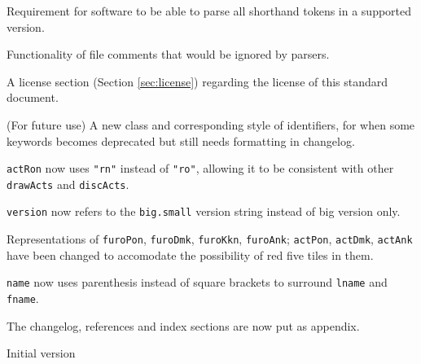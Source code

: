 \documentclass[%
	a4paper%
	,10pt%
	,twoside%
	,notitlepage%
]{article}%
\renewcommand*{\DTMdisplaydate}[4]{%
		\ifnum##4>-1{\DTMenglishshortweekdayname{##4}\space}\fi%
		\DTMtwodigits{##3}\space%
		\DTMenglishshortmonthname{##2}\space%
		##1%
	}%
\newcommand*{\github}[1]{\texorpdfstring{\href{https://github.com/#1}{\texttt{#1}}}{#1}}%
\begin{document}
\begin{changelog}[%
	section=true%
	,sectioncmd={\section}%
	,title={Changelog}%
	,label={sec:changelog}%
]
\begin{version}[%
		version=1.0.0-β%
		,author={\github{ChemistMikeLam}}%
		,date=Unreleased%
	]
			\item{}Requirement for software to be able to parse all shorthand tokens in a supported version. %
			\item{}Functionality of file comments that would be ignored by parsers. %
			\item{}A license section (Section \ref{sec:license}) regarding the license of this standard document. %
			\item{}(For future use) A new class and corresponding style of identifiers, for when some keywords becomes deprecated but still needs formatting in changelog. %
		\changed{}%
			\item{}\lstinline/actRon/ now uses \lstinline/"rn"/ instead of \lstinline/"ro"/, allowing it to be consistent with other \lstinline/drawActs/ and \lstinline/discActs/. %
			\item{}\lstinline/version/ now refers to the \texttt{big.small} version string instead of big version only. %
			\item{}Representations of \lstinline/furoPon/, \lstinline/furoDmk/, \lstinline/furoKkn/, \lstinline/furoAnk/; \lstinline/actPon/, \lstinline/actDmk/, \lstinline/actAnk/ have been changed to accomodate the possibility of red five tiles in them. %
			\item{}\lstinline/name/ now uses parenthesis instead of square brackets to surround \lstinline/lname/ and \lstinline/fname/. %
			\item{}The changelog, references and index sections are now put as appendix. %
	\end{version}%
	\begin{version}[%
		version=0.0.0%
		,author={\github{ChemistMikeLam}}%
		,date={\DTMdisplaydate{2020}{06}{23}{1}}%
		,simple=true%
	]%
		\item{}Initial version%
	\end{version}%
\end{changelog}%
% 
\end{document}
